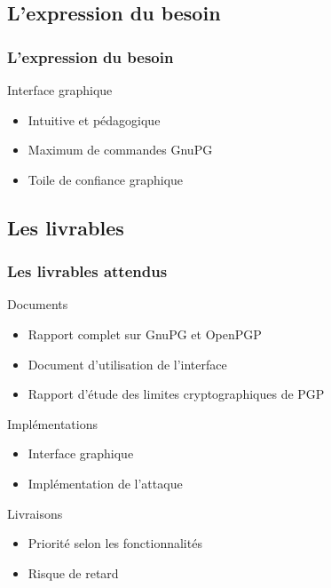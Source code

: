 \subsection{L'expression du besoin}

\begin{frame}
  \frametitle{\color{white} L'expression du besoin}
  \begin{block}{Interface graphique}
   \begin{itemize}
    \item Intuitive et pédagogique
    \item Maximum de commandes GnuPG
    \item Toile de confiance graphique
   \end{itemize}
  \end{block}

\end{frame}


\subsection{Les livrables}

\begin{frame}
  \frametitle{\color{white} Les livrables attendus}
  \begin{block}{Documents}
   \begin{itemize}
    \item Rapport complet sur GnuPG et OpenPGP
    \item Document d'utilisation de l'interface
    \item Rapport d'étude des limites cryptographiques de PGP
   \end{itemize}

  \end{block}
  
  \begin{block}{Implémentations}
   \begin{itemize}
    \item Interface graphique
    \item Implémentation de l'attaque
   \end{itemize}
  \end{block}
  
  \begin{block}{Livraisons}
   \begin{itemize}
    \item Priorité selon les fonctionnalités
    \item Risque de retard
   \end{itemize}

  \end{block}


  

\end{frame}
